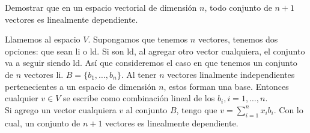 \item Demostrar que en un espacio vectorial de dimensión $n$, todo conjunto de $n+1$ vectores es linealmente dependiente.
    \begin{mdframed}[style=s]
        Llamemos al espacio $V$. Supongamos que tenemos $n$ vectores, tenemos dos opciones: que sean li o ld. Si son ld, al agregar otro vector cualquiera, el conjunto va a seguir siendo ld. Así que consideremos el caso en que tenemos un conjunto de $n$ vectores li. $B=\{b_1,\dots,b_n\}$. Al tener $n$ vectores linalmente independientes pertenecientes a un espacio de dimensión $n$, estos forman una base. Entonces cualquier $v\in V$ se escribe como combinación lineal de los $b_i,i=1,\dots,n$.\\
        Si agrego un vector cualquiera $v$ al conjunto $B$, tengo que $v=\sum_{i=1}^nx_ib_i$. Con lo cual, un conjunto de $n+1$ vectores es linealmente dependiente.
    \end{mdframed}